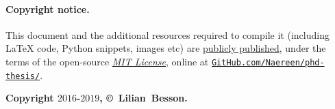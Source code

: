 


\vfill{}

\hr{}

\paragraph{Copyright notice.}
%
This document and the additional resources required to compile it (including \LaTeX{} code, Python snippets, images etc)
are \href{https://github.com/Naereen/phd-thesis/}{publicly published},
under the terms of the open-source \href{https://lbesson.mit-license.org/}{\emph{MIT License}},
online at \href{https://github.com/Naereen/phd-thesis/}{\texttt{GitHub.com/Naereen/phd-thesis/}}.


\begin{center}
    \textbf{Copyright $2016$-$2019$, \copyright ~Lilian~Besson.}
\end{center}
